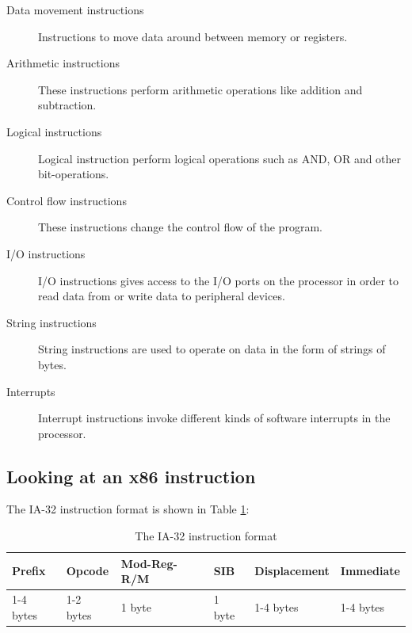 \documentclass[11pt,twoside]{eitExjobb}
\begin{document}
\begin{description}
\item[Data movement instructions] Instructions to move data around between memory or registers. 
\item[Arithmetic instructions] These instructions perform arithmetic operations like addition and subtraction.
\item[Logical instructions] Logical instruction perform logical operations such as AND, OR and other bit-operations.
\item[Control flow instructions] These instructions change the control flow of the program.
\item[I/O instructions] I/O instructions gives access to the I/O ports on the processor in order to read data from or write data to peripheral devices.
\item[String instructions] String instructions are used to operate on data in the form of strings of bytes.
\item[Interrupts] Interrupt instructions invoke different kinds of software interrupts in the processor.
\end{description}

\subsection{Looking at an x86 instruction}
The IA-32 instruction format is shown in Table \ref{table:ia32instructionformat}: \\

\begin{table}[h]
\begin{tabular}{|l|l|l|l|l|l|}
\hline
Prefix & Opcode & Mod-Reg-R/M & SIB & Displacement & Immediate \\ \hline
1-4 bytes & 1-2 bytes & 1 byte & 1 byte & 1-4 bytes & 1-4 bytes \\
\hline
\end{tabular}
\caption{The IA-32 instruction format}
\label{table:ia32instructionformat}
\end{table}
\end{document}
